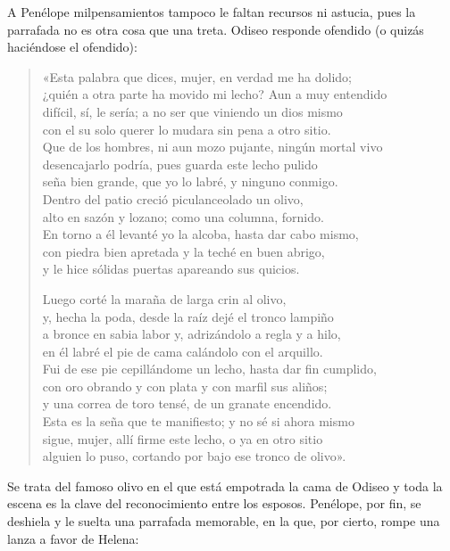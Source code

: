 A Penélope milpensamientos tampoco le faltan recursos ni astucia, pues la parrafada no es otra cosa que una treta. Odiseo responde ofendido (o quizás haciéndose el ofendido):

\begin{verse}
«Esta palabra que dices, mujer, en verdad me ha dolido;\\
¿quién a otra parte ha movido mi lecho? Aun a muy entendido\\
difícil, sí, le sería; a no ser que viniendo un dios mismo\\
con el su solo querer lo mudara sin pena a otro sitio.\\
Que de los hombres, ni aun mozo pujante, ningún mortal vivo\\
desencajarlo podría, pues guarda este lecho pulido\\
seña bien grande, que yo lo labré, y ninguno conmigo.\\
Dentro del patio creció piculanceolado un olivo,\\
alto en sazón y lozano; como una columna, fornido.\\
En torno a él levanté yo la alcoba, hasta dar cabo mismo,\\
con piedra bien apretada y la teché en buen abrigo,\\
y le hice sólidas puertas apareando sus quicios.

Luego corté la maraña de larga crin al olivo,\\
y, hecha la poda, desde la raíz dejé el tronco lampiño\\
a bronce en sabia labor y, adrizándolo a regla y a hilo,\\
en él labré el pie de cama calándolo con el arquillo.\\
Fui de ese pie cepillándome un lecho, hasta dar fin cumplido,\\
con oro obrando y con plata y con marfil sus aliños;\\
y una correa de toro tensé, de un granate encendido.\\
Esta es la seña que te manifiesto; y no sé si ahora mismo\\
sigue, mujer, allí firme este lecho, o ya en otro sitio\\
alguien lo puso, cortando por bajo ese tronco de olivo».
\end{verse}

Se trata del famoso olivo en el que está empotrada la cama de Odiseo y toda la escena es la clave del reconocimiento entre los esposos. Penélope, por fin, se deshiela y le suelta una parrafada memorable, en la que, por cierto, rompe una lanza a favor de Helena:

